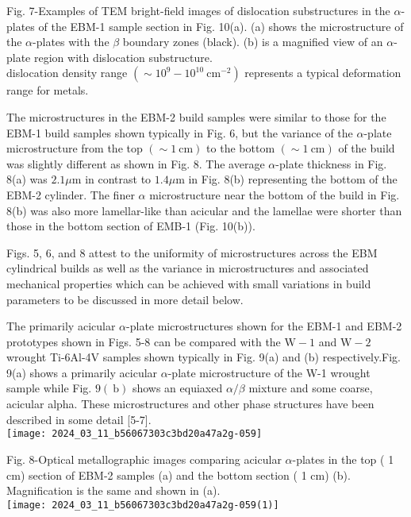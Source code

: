 \documentclass[10pt]{article}
\begin{document}
Fig. 7-Examples of TEM bright-field images of dislocation substructures in the $\alpha$-plates of the EBM-1 sample section in Fig. 10(a). (a) shows the microstructure of the $\alpha$-plates with the $\beta$ boundary zones (black). (b) is a magnified view of an $\alpha$-plate region with dislocation substructure.\\
dislocation density range $\left(\sim 10^{9}-10^{10} \mathrm{~cm}^{-2}\right)$ represents a typical deformation range for metals.

The microstructures in the EBM-2 build samples were similar to those for the EBM-1 build samples shown typically in Fig. 6, but the variance of the $\alpha$-plate microstructure from the top $(\sim 1 \mathrm{~cm})$ to the bottom $(\sim 1 \mathrm{~cm})$ of the build was slightly different as shown in Fig. 8. The average $\alpha$-plate thickness in Fig. 8(a) was $2.1 \mu \mathrm{m}$ in contrast to $1.4 \mu \mathrm{m}$ in Fig. 8(b) representing the bottom of the EBM-2 cylinder. The finer $\alpha$ microstructure near the bottom of the build in Fig. 8(b) was also more lamellar-like than acicular and the lamellae were shorter than those in the bottom section of EMB-1 (Fig. 10(b)).

Figs. 5, 6, and 8 attest to the uniformity of microstructures across the EBM cylindrical builds as well as the variance in microstructures and associated mechanical properties which can be achieved with small variations in build parameters to be discussed in more detail below.

The primarily acicular $\alpha$-plate microstructures shown for the EBM-1 and EBM-2 prototypes shown in Figs. 5-8 can be compared with the $\mathrm{W}-1$ and $\mathrm{W}-2$ wrought Ti-6Al-4V samples shown typically in Fig. 9(a) and (b) respectively.Fig. 9(a) shows a primarily acicular $\alpha$-plate microstructure of the W-1 wrought sample while Fig. $9(\mathrm{~b})$ shows an equiaxed $\alpha / \beta$ mixture and some coarse, acicular alpha. These microstructures and other phase structures have been described in some detail [5-7].\\
\texttt{[image: 2024\_03\_11\_b56067303c3bd20a47a2g-059]}

Fig. 8-Optical metallographic images comparing acicular $\alpha$-plates in the top ( 1 cm) section of EBM-2 samples (a) and the bottom section ( 1 cm) (b). Magnification is the same and shown in (a).\\
\texttt{[image: 2024\_03\_11\_b56067303c3bd20a47a2g-059(1)]}
\end{document}
